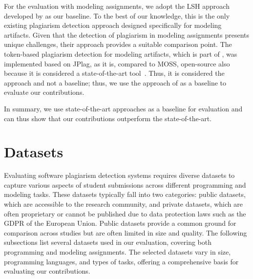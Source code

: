 For the evaluation with modeling assignments, we adopt the \ac{LSH} approach developed by \citet{Martinez2020} as our baseline. To the best of our knowledge, this is the only existing plagiarism detection approach designed specifically for modeling artifacts. Given that the detection of plagiarism in modeling assignments presents unique challenges, their approach provides a suitable comparison point.
%
The token-based plagiarism detection for modeling artifacts, which is part of , was implemented based on JPlag, as it is, compared to MOSS, open-source also because it is considered a state-of-the-art tool~\cite{Novak2019, weber2012, Aniceto2021}. Thus, it is considered the approach and not a baseline; thus, we use the approach of \citet{Martinez2020} as a baseline to evaluate our contributions.

In summary, we use state-of-the-art approaches as a baseline for evaluation and can thus show that our contributions outperform the state-of-the-art.


\section{Datasets}\label{sec:datasets}
Evaluating software plagiarism detection systems requires diverse datasets to capture various aspects of student submissions across different programming and modeling tasks. These datasets typically fall into two categories: public datasets, which are accessible to the research community, and private datasets, which are often proprietary or cannot be published due to data protection laws such as the \ac{GDPR} of the European Union. Public datasets provide a common ground for comparison across studies but are often limited in size and quality. 
%
The following subsections list several datasets used in our evaluation, covering both programming and modeling assignments. The selected datasets vary in size, programming languages, and types of tasks, offering a comprehensive basis for evaluating our contributions. 


